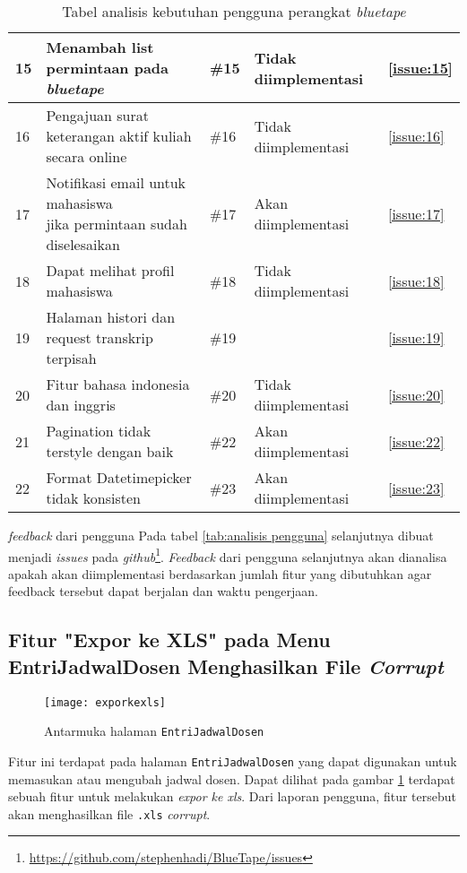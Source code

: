 \begin{table}[H]
{\begin{tabular}{|l|l|l|l|l|}
	15 & Menambah list permintaan pada \textit{bluetape} & \#15 & Tidak diimplementasi & \ref{issue:15} \\ \hline
	16 & Pengajuan surat keterangan aktif kuliah secara online & \#16 & Tidak diimplementasi & \ref{issue:16} \\ \hline
	17 & \makecell[l]{Notifikasi email untuk mahasiswa \\ jika permintaan sudah diselesaikan} & \#17 & Akan diimplementasi &  \ref{issue:17}\\ \hline
	18 & Dapat melihat profil mahasiswa & \#18 & Tidak diimplementasi & \ref{issue:18}\\ \hline
	19 & Halaman histori dan request transkrip terpisah & \#19 & & \ref{issue:19}\\ \hline
	20 & Fitur bahasa indonesia dan inggris & \#20 & Tidak diimplementasi & \ref{issue:20} \\ \hline
	21 & Pagination tidak terstyle dengan baik & \#22 & Akan diimplementasi & \ref{issue:22}\\ \hline
	22 & Format Datetimepicker tidak konsisten &\#23 & Akan diimplementasi & \ref{issue:23}\\ \hline
	
	
	\end{tabular}}
	\caption{Tabel analisis kebutuhan pengguna perangkat \textit{bluetape}}
\end{table}


\textit{feedback} dari pengguna Pada tabel \ref{tab:analisis pengguna} selanjutnya dibuat menjadi \textit{issues} pada \textit{github}\footnote{\url{https://github.com/stephenhadi/BlueTape/issues}}. \textit{Feedback} dari pengguna selanjutnya akan dianalisa apakah akan diimplementasi berdasarkan jumlah fitur yang dibutuhkan agar feedback tersebut dapat berjalan dan waktu pengerjaan.


\subsection{Fitur "Expor ke XLS" pada Menu EntriJadwalDosen Menghasilkan File  \textit{Corrupt}}
\label{issue:1}
\begin{figure}[H]
	\centering
	\texttt{[image: exporkexls]} 
	\caption{Antarmuka halaman \texttt{EntriJadwalDosen}}
	\label{fig:EntriJadwalDosen} 
\end{figure}

Fitur ini terdapat pada halaman \texttt{EntriJadwalDosen} yang dapat digunakan untuk memasukan atau mengubah jadwal dosen. Dapat dilihat pada gambar \ref{fig:EntriJadwalDosen} terdapat sebuah fitur untuk melakukan \textit{expor ke xls}. Dari laporan pengguna, fitur tersebut akan menghasilkan file \texttt{.xls} \textit{corrupt}.

